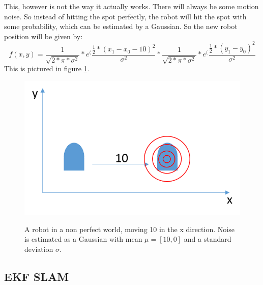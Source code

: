 This, however is not the way it actually works. There will always be some motion noise. So instead of hitting the spot perfectly, the robot will hit the spot with some probability, which can be estimated by a Gaussian. So the new robot position will be given by:
\begin{equation}
f(x,y)=\frac{1}{\sqrt{2*\pi*\sigma^2}}*e^(\frac{\frac{1}{2}*(x_1-x_0-10)^2}{\sigma^2}*\frac{1}{\sqrt{2*\pi*\sigma^2}}*e^(\frac{\frac{1}{2}*(y_1-y_0)^2}{\sigma^2}
\end{equation}
This is pictured in figure \ref{GraphSLAM02}.
\begin{figure}[h!]
  \caption{A robot in a non perfect world, moving 10 in the x direction. Noise is estimated as a Gaussian with mean $\mu = [10,0]$ and a standard deviation $\sigma$.}
    \includegraphics{billeder/GraphSLAM02.png} \label{GraphSLAM02}
\end{figure}


\subsection{EKF SLAM}

